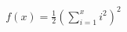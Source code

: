 \documentclass{article}
\begin{document}
\begin{align*}
    f(x)=\frac{1}{2}\left(\sum_{i=1}^{x} i^2\right)^2
\end{align*}
\end{document}
